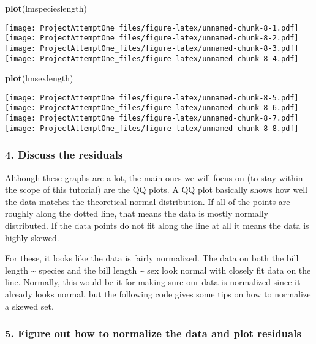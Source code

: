 \documentclass[
]{article}
\newenvironment{Shaded}{\begin{snugshade}}{\end{snugshade}}
\newcommand{\FunctionTok}[1]{\textcolor[rgb]{0.13,0.29,0.53}{\textbf{#1}}}
\newcommand{\NormalTok}[1]{#1}
\begin{document}
\begin{Shaded}
\begin{Highlighting}[]
\FunctionTok{plot}\NormalTok{(lmspecieslength)}
\end{Highlighting}
\end{Shaded}

\texttt{[image: ProjectAttemptOne\_files/figure-latex/unnamed-chunk-8-1.pdf]}
\texttt{[image: ProjectAttemptOne\_files/figure-latex/unnamed-chunk-8-2.pdf]}
\texttt{[image: ProjectAttemptOne\_files/figure-latex/unnamed-chunk-8-3.pdf]}
\texttt{[image: ProjectAttemptOne\_files/figure-latex/unnamed-chunk-8-4.pdf]}

\begin{Shaded}
\begin{Highlighting}[]
\FunctionTok{plot}\NormalTok{(lmsexlength)}
\end{Highlighting}
\end{Shaded}

\texttt{[image: ProjectAttemptOne\_files/figure-latex/unnamed-chunk-8-5.pdf]}
\texttt{[image: ProjectAttemptOne\_files/figure-latex/unnamed-chunk-8-6.pdf]}
\texttt{[image: ProjectAttemptOne\_files/figure-latex/unnamed-chunk-8-7.pdf]}
\texttt{[image: ProjectAttemptOne\_files/figure-latex/unnamed-chunk-8-8.pdf]}

\subsubsection{4. Discuss the residuals}\label{discuss-the-residuals}

Although these graphs are a lot, the main ones we will focus on (to stay
within the scope of this tutorial) are the QQ plots. A QQ plot basically
shows how well the data matches the theoretical normal distribution. If
all of the points are roughly along the dotted line, that means the data
is mostly normally distributed. If the data points do not fit along the
line at all it means the data is highly skewed.

For these, it looks like the data is fairly normalized. The data on both
the bill length \textasciitilde{} species and the bill length
\textasciitilde{} sex look normal with closely fit data on the line.
Normally, this would be it for making sure our data is normalized since
it already looks normal, but the following code gives some tips on how
to normalize a skewed set.

\subsubsection{5. Figure out how to normalize the data and plot
residuals}\label{figure-out-how-to-normalize-the-data-and-plot-residuals}
\end{document}
